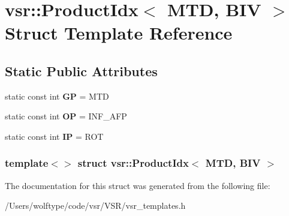 \hypertarget{structvsr_1_1_product_idx_3_01_m_t_d_00_01_b_i_v_01_4}{\section{vsr\-:\-:Product\-Idx$<$ M\-T\-D, B\-I\-V $>$ Struct Template Reference}
\label{structvsr_1_1_product_idx_3_01_m_t_d_00_01_b_i_v_01_4}
}
\subsection*{Static Public Attributes}
\begin{DoxyCompactItemize}
\item 
\hypertarget{structvsr_1_1_product_idx_3_01_m_t_d_00_01_b_i_v_01_4_a48c96bdd432cfb758de59610e9301b83}{static const int {\bfseries G\-P} = M\-T\-D}\label{structvsr_1_1_product_idx_3_01_m_t_d_00_01_b_i_v_01_4_a48c96bdd432cfb758de59610e9301b83}

\item 
\hypertarget{structvsr_1_1_product_idx_3_01_m_t_d_00_01_b_i_v_01_4_ae9f07437e87c02c17ead18e8654a6196}{static const int {\bfseries O\-P} = I\-N\-F\-\_\-\-A\-F\-P}\label{structvsr_1_1_product_idx_3_01_m_t_d_00_01_b_i_v_01_4_ae9f07437e87c02c17ead18e8654a6196}

\item 
\hypertarget{structvsr_1_1_product_idx_3_01_m_t_d_00_01_b_i_v_01_4_adddebb690a1f75c7167b45bc61c2dba8}{static const int {\bfseries I\-P} = R\-O\-T}\label{structvsr_1_1_product_idx_3_01_m_t_d_00_01_b_i_v_01_4_adddebb690a1f75c7167b45bc61c2dba8}

\end{DoxyCompactItemize}
\subsubsection*{template$<$$>$ struct vsr\-::\-Product\-Idx$<$ M\-T\-D, B\-I\-V $>$}



The documentation for this struct was generated from the following file\-:\begin{DoxyCompactItemize}
\item 
/\-Users/wolftype/code/vsr/\-V\-S\-R/vsr\-\_\-templates.\-h\end{DoxyCompactItemize}
